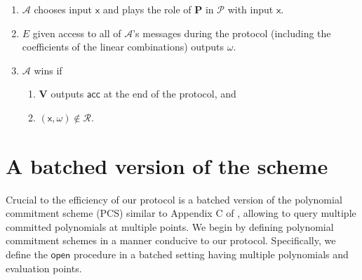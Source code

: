 \documentclass[11pt]{article} %
\newcommand{\adv}{\ensuremath{\mathcal A}\xspace}
\newcommand{\open}{\ensuremath{\mathsf{open}}\xspace}
\newcommand{\acc}{\ensuremath{\mathsf{acc}}\xspace}
\newcommand{\prv}{\ensuremath{\mathsf{\mathbf{P}}}\xspace}
\newcommand{\inp}{\ensuremath{\mathsf{x}}\xspace}
\newcommand{\wit}{\ensuremath{\omega}\xspace}
\newcommand{\ver}{\ensuremath{\mathsf{\mathbf{V}}}\xspace}
\newcommand{\rel}{\ensuremath{\mathcal{R}}\xspace}
\newcommand{\ext}{\ensuremath{E}\xspace}
\newcommand{\prot}{\ensuremath{\mathscr{P}}\xspace}
\begin{document}
\begin{enumerate}
 \item \adv chooses input \inp and plays the role of \prv in \prot with input \inp.
 \item \ext given access to all of \adv's messages during the protocol (including the coefficients of the linear combinations) outputs \wit.
 \item \adv wins if 
 \begin{enumerate}
  \item \ver outputs \acc at the end of the protocol, and 
  \item $(\inp,\wit)\notin \rel$.
 \end{enumerate}

\end{enumerate}



\section{A batched version of the \cite{kate} scheme}\label{sec:kate}
Crucial to the efficiency of our protocol is a batched version of the \cite{kate} polynomial commitment scheme (PCS) similar to Appendix C of \cite{sonic}, allowing to query multiple committed polynomials at multiple points.
We begin by defining polynomial commitment schemes in a manner conducive to our protocol.
Specifically, we define the \open procedure in a batched setting having multiple polynomials and evaluation points.
\end{document}
